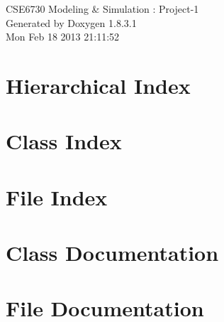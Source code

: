 \documentclass{book}
\begin{document}
\hypersetup{pageanchor=false,citecolor=blue}
\begin{titlepage}
\vspace*{7cm}
\begin{center}
{\Large C\-S\-E6730 Modeling \& Simulation \-: Project-\/1 }\\
\vspace*{1cm}
{\large Generated by Doxygen 1.8.3.1}\\
\vspace*{0.5cm}
{\small Mon Feb 18 2013 21:11:52}\\
\end{center}
\end{titlepage}
\clearemptydoublepage
{}
\tableofcontents
\clearemptydoublepage
{}
\hypersetup{pageanchor=true,citecolor=blue}
\chapter{Hierarchical Index}

\chapter{Class Index}

\chapter{File Index}

\chapter{Class Documentation}



















\chapter{File Documentation}















\printindex
\end{document}
